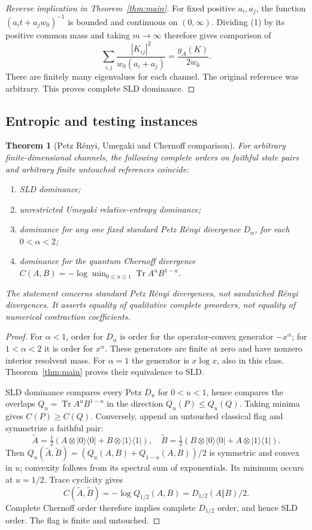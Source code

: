 \documentclass[11pt]{article}
\newtheorem{theorem}{Theorem}
\newcommand{\Tr}{\operatorname{Tr}}
\begin{document}
\begin{proof}[Reverse implication in Theorem~\ref{thm:main}]
For fixed positive $a_i,a_j$, the function $(a_it+a_jw_0)^{-1}$ is bounded and continuous on $(0,\infty)$. Dividing (1) by its positive common mass and taking $m\to\infty$ therefore gives comparison of
\[
 \sum_{i,j}\frac{|K_{ij}|^2}{w_0(a_i+a_j)}
 =\frac{g_A(K)}{2w_0}.
\]
There are finitely many eigenvalues for each channel. The original reference was arbitrary. This proves complete SLD dominance.
\end{proof}

\subsection{Entropic and testing instances}
\begin{theorem}[Petz R\'enyi, Umegaki and Chernoff comparison]
For arbitrary finite-dimensional channels, the following complete orders on faithful state pairs and arbitrary finite untouched references coincide:
\begin{enumerate}
\item SLD dominance;
\item unrestricted Umegaki relative-entropy dominance;
\item dominance for any one fixed standard Petz R\'enyi divergence $D_\alpha$, for each $0<\alpha<2$;
\item dominance for the quantum Chernoff divergence
$C(A,B)=-\log\min_{0\leq u\leq1}\Tr A^uB^{1-u}$.
\end{enumerate}
The statement concerns standard Petz R\'enyi divergences, not sandwiched R\'enyi divergences. It asserts equality of qualitative complete preorders, not equality of numerical contraction coefficients.
\end{theorem}

\begin{proof}
For $\alpha<1$, order for $D_\alpha$ is order for the operator-convex generator $-x^\alpha$; for $1<\alpha<2$ it is order for $x^\alpha$. These generators are finite at zero and have nonzero interior resolvent mass. For $\alpha=1$ the generator is $x\log x$, also in this class. Theorem~\ref{thm:main} proves their equivalence to SLD.

SLD dominance compares every Petz $D_u$ for $0<u<1$, hence compares the overlaps $Q_u=\Tr A^uB^{1-u}$ in the direction $Q_u(P)\leq Q_u(Q)$. Taking minima gives $C(P)\geq C(Q)$.
Conversely, append an untouched classical flag and symmetrize a faithful pair:
\[
 \widetilde A=\tfrac12(A\otimes|0\rangle\langle0|+B\otimes|1\rangle\langle1|),\quad
 \widetilde B=\tfrac12(B\otimes|0\rangle\langle0|+A\otimes|1\rangle\langle1|).
\]
Then $Q_u(\widetilde A,\widetilde B)=(Q_u(A,B)+Q_{1-u}(A,B))/2$ is symmetric and convex in $u$; convexity follows from its spectral sum of exponentials. Its minimum occurs at $u=1/2$. Trace cyclicity gives
\[
 C(\widetilde A,\widetilde B)=-\log Q_{1/2}(A,B)=D_{1/2}(A\Vert B)/2.
\]
Complete Chernoff order therefore implies complete $D_{1/2}$ order, and hence SLD order. The flag is finite and untouched.
\end{proof}
\end{document}
